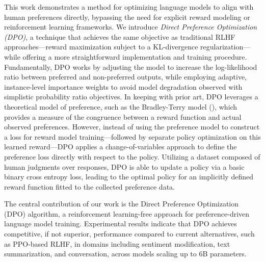 This work demonstrates a method for optimizing language models to align with human preferences directly, bypassing the need for explicit reward modeling or reinforcement learning frameworks. We introduce \textit{{Direct Preference Optimization} (DPO)}, a technique that achieves the same objective as traditional RLHF approaches—reward maximization subject to a KL-divergence regularization—while offering a more straightforward implementation and training procedure. Fundamentally, DPO works by adjusting the model to increase the log-likelihood ratio between preferred and non-preferred outputs, while employing adaptive, instance-level importance weights to avoid model degradation observed with simplistic probability ratio objectives. In keeping with prior art, DPO leverages a theoretical model of preference, such as the Bradley-Terry model (\cite{bradley1952rankanalysis}), which provides a measure of the congruence between a reward function and actual observed preferences. However, instead of using the preference model to construct a loss for reward model training—followed by separate policy optimization on this learned reward—DPO applies a change-of-variables approach to define the preference loss directly with respect to the policy. Utilizing a dataset composed of human judgments over responses, DPO is able to update a policy via a basic binary cross entropy loss, leading to the optimal policy for an implicitly defined reward function fitted to the collected preference data.

The central contribution of our work is the Direct Preference Optimization (DPO) algorithm, a reinforcement learning-free approach for preference-driven language model training. Experimental results indicate that DPO achieves competitive, if not superior, performance compared to current alternatives, such as PPO-based RLHF, in domains including sentiment modification, text summarization, and conversation, across models scaling up to 6B parameters.

